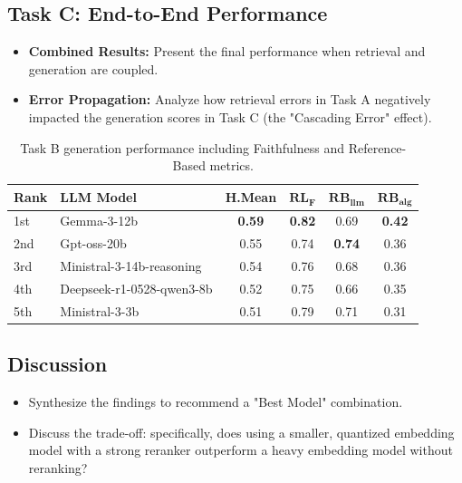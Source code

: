 \documentclass[11pt]{article}
\begin{document}
\subsection{Task C: End-to-End Performance}
\begin{itemize}
    \item \textbf{Combined Results:} Present the final performance when retrieval and generation are coupled.
    \item \textbf{Error Propagation:} Analyze how retrieval errors in Task A negatively impacted the generation scores in Task C (the "Cascading Error" effect).
\end{itemize}
\begin{table}[h!]
    \centering
    \small
    \setlength{\tabcolsep}{4pt}
        \begin{tabular}{llcccc} %
            \hline
            \textbf{Rank} & \textbf{LLM Model} & \textbf{H.Mean} & $\mathbf{RL_{F}}$ & $\mathbf{RB_{llm}}$ & $\mathbf{RB_{alg}}$ \\
            \hline
            1st & Gemma-3-12b & \textbf{0.59} & \textbf{0.82} & 0.69 & \textbf{0.42} \\
            2nd & Gpt-oss-20b & 0.55 & 0.74 & \textbf{0.74} & 0.36 \\
            3rd & Ministral-3-14b-reasoning & 0.54 & 0.76 & 0.68 & 0.36 \\
            4th & Deepseek-r1-0528-qwen3-8b & 0.52 & 0.75 & 0.66 & 0.35 \\
            5th & Ministral-3-3b & 0.51 & 0.79 & 0.71 & 0.31 \\
            \hline
\end{tabular}%
    
    \caption{Task B generation performance including Faithfulness and Reference-Based metrics.}
    \label{tab:task_b_results}
\end{table}

\subsection{Discussion}
\begin{itemize}
    \item Synthesize the findings to recommend a "Best Model" combination.
    \item Discuss the trade-off: specifically, does using a smaller, quantized embedding model with a strong reranker outperform a heavy embedding model without reranking?
\end{itemize}
\end{document}
